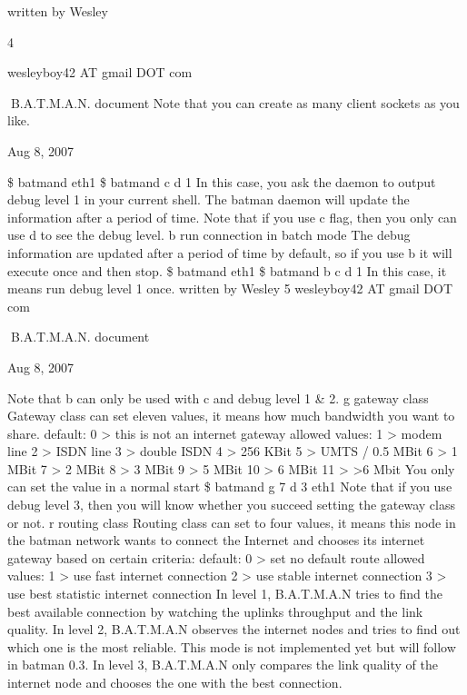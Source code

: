 \documentclass[
	12pt,
	a4paper,
	twoside,
	english,
	headsepline,
	footnosepline,
	automark,
	normalheadings,
	openany,
	cleardoubleplain,
	abstracton,
	idxtotoc,
	liststotoc,
	bibtotoc,
 	BCOR8mm,
]{scrartcl}
\begin{document}
written by Wesley

4

wesleyboy42 AT gmail DOT com

B.A.T.M.A.N. document Note that you can create as many client sockets as you like.

Aug 8, 2007

\$ batmand eth1 \$ batmand   c  d 1  In this case, you ask the daemon to output debug level 1 in your current shell. The batman  daemon will update the information after a period of time. Note that if you use  c flag, then you only can use  d to see the debug level.  b run connection in batch mode The debug information are updated  after a  period of time by default, so if you use  b it will  execute once and then stop.  \$ batmand eth1 \$ batmand   b  c  d 1  In this case, it means run debug level 1 once. written by Wesley 5 wesleyboy42 AT gmail DOT com

B.A.T.M.A.N. document

Aug 8, 2007

Note that  b can only be used with  c and debug level 1 \& 2.   g gateway class Gateway class can set eleven values, it means how much bandwidth you want to share.           default:            0  > this is not an internet gateway           allowed values:  1  > modem line                               2  > ISDN line                             3  > double ISDN                                4  > 256 KBit                               5  > UMTS / 0.5 MBit                             6  > 1 MBit                             7  > 2 MBit                             8  > 3 MBit                             9  > 5 MBit                            10  > 6 MBit                            11  > >6 Mbit You only can set the value in a normal start \$ batmand  g 7  d 3  eth1 Note that if you use debug level 3, then you will know whether you succeed setting the  gateway class or not.  r routing class Routing class can set to four values, it means this node in the batman network wants to  connect the Internet and chooses its internet gateway based on certain criteria:           default:           0  > set no default route           allowed values:  1  > use fast internet connection                              2  > use stable internet connection                              3  > use best statistic internet connection In level 1, B.A.T.M.A.N tries to find the best available connection by watching the uplinks  throughput and the link quality. In level 2, B.A.T.M.A.N observes the internet nodes and tries to find out which one is the  most reliable. This mode is not implemented yet but will follow in batman 0.3. In level 3, B.A.T.M.A.N only compares the link quality of the internet node and chooses the  one with the best connection.
\end{document}
